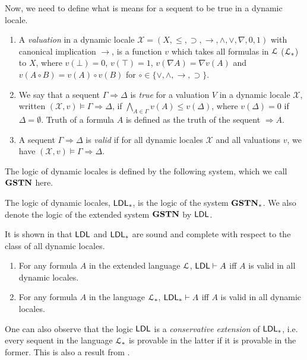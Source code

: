   Now, we need to define what is means for a sequent to be true in a dynamic locale.
  \begin{dfn}\quad
    \begin{enumerate}
      \item A \emph{valuation} in a dynamic locale $\mathcal{X} = (X, \le, \supset, \rightarrow, \wedge, \vee, \nabla, 0, 1)$ with canonical implication $\rightarrow$, is a function $v$ which takes all formulas in $\mathcal{L}$ ($\mathcal{L}_*$) to $X$, where $v(\bot) = 0$, $v(\top) = 1$, $v(\nabla A) = \nabla v(A)$ and  $v(A \circ B) = v(A) \circ v(B)$ for $\circ \in \{\vee, \wedge, \rightarrow, \supset\}$.
      \item We say that a sequent $\Gamma \Rightarrow \Delta$ is \emph{true} for a valuation $V$ in a dynamic locale $\mathcal{X}$, written $(\mathcal{X}, v) \vDash \Gamma \Rightarrow \Delta$, if $\bigwedge_{A \in \Gamma} v(A) \le v(\Delta)$, where $v(\Delta) = 0$ if $\Delta = \emptyset$. Truth of a formula $A$ is defined as the truth of the sequent $\Rightarrow A$.
      \item A sequent $\Gamma \Rightarrow \Delta$ is \emph{valid} if for all dynamic locales $\mathcal{X}$ and all valuations $v$, we have $(\mathcal{X}, v) \vDash \Gamma \Rightarrow \Delta$.
    \end{enumerate}
  \end{dfn}
  
  The logic of dynamic locales is defined by the following system, which we call $\mathbf{GSTN}$ here.
  

  The logic of dynamic locales, $\mathsf{LDL}_*$, is the logic of the system $\mathbf{GSTN}_*$. We also denote the logic of the extended system $\mathbf{GSTN}$ by $\mathsf{LDL}$.
  
  It is shown in \cite{amir} that $\mathsf{LDL}$ and $\mathsf{LDL}_*$ are sound and complete with respect to the class of all dynamic locales.
  \begin{thm} \quad
    \begin{enumerate}
      \item For any formula $A$ in the extended language $\mathcal{L}$, $\mathsf{LDL} \vdash A$ iff $A$ is valid in all dynamic locales.
      \item For any formula $A$ in the language $\mathcal{L}_*$, $\mathsf{LDL}_* \vdash A$ iff $A$ is valid in all dynamic locales.
    \end{enumerate}
  \end{thm}
  
  One can also observe that the logic $\mathsf{LDL}$ is a \emph{conservative extension} of $\mathsf{LDL}_*$, i.e. every sequent in the language $\mathcal{L}_*$ is provable in the latter if it is provable in the former. This is also a result from \cite{amir}.


